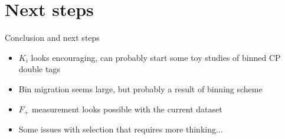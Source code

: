 \documentclass{beamer}
\begin{document}
\section{Next steps}
\begin{frame}{Conclusion and next steps}
  \begin{itemize}
    \setlength\itemsep{1.5em}
    \item{$K_i$ looks encouraging, can probably start some toy studies of binned CP double tags}
    \item{Bin migration seems large, but probably a result of binning scheme}
    \item{$F_+$ measurement looks possible with the current dataset}
    \item{Some issues with selection that requires more thinking...}
  \end{itemize}
\end{frame}
\end{document}
